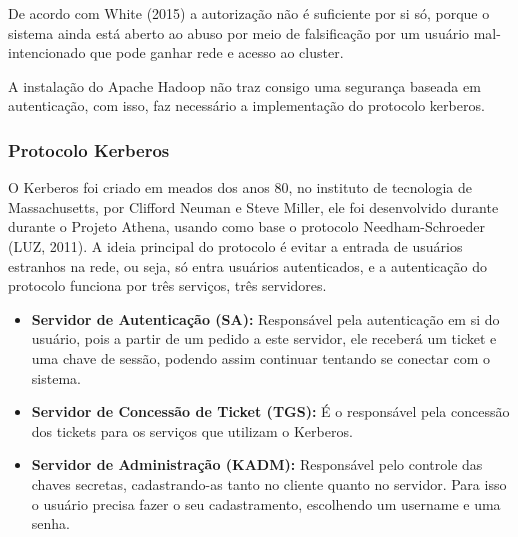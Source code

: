 De acordo com White (2015) a autorização não é suficiente por si só, porque o sistema ainda está aberto ao abuso por meio de falsificação por um usuário mal-intencionado que pode ganhar rede e acesso ao cluster.

A instalação do Apache Hadoop não traz consigo uma segurança baseada em autenticação, com isso, faz necessário a implementação do protocolo kerberos.

\subsubsection{Protocolo Kerberos}

O Kerberos foi criado em meados dos anos 80, no instituto de tecnologia de Massachusetts, por Clifford Neuman e Steve Miller, ele foi desenvolvido durante durante o Projeto Athena, usando como base o protocolo Needham-Schroeder (LUZ, 2011).
A ideia principal do protocolo é evitar a entrada de usuários estranhos na rede, ou seja, só entra usuários autenticados, e a autenticação do protocolo funciona por três serviços, três servidores. 

\begin{itemize}

\item \textbf{Servidor de Autenticação (SA):} Responsável pela autenticação em si do usuário, pois a partir de um pedido a este servidor, ele receberá um ticket e uma chave de sessão, podendo assim continuar tentando se conectar com o sistema.\\

\item \textbf{Servidor de Concessão de Ticket (TGS):} É o responsável pela concessão dos tickets para os serviços que utilizam o Kerberos.\\

\item \textbf{Servidor de Administração (KADM):} Responsável pelo controle das chaves secretas, cadastrando-as tanto no cliente quanto no servidor. Para isso o usuário precisa fazer o seu cadastramento, escolhendo um username e uma senha.\\

\end{itemize}

